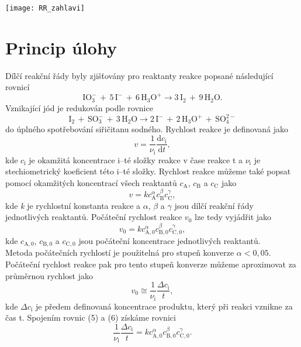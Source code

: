 \documentclass[12pt,a4paper]{article}
\def\ri#1{\mathrm{#1}}
\begin{document}
\begin{center}
\texttt{[image: RR\_zahlavi]}
\end{center}
\section*{Princip úlohy}
\noindent Dílčí reakční řády byly zjišťovány pro reaktanty reakce popsané následující rovnicí
\begin{equation}
	\ri{IO_3^-\,+\,5\,I^-\,+\,6\,H_3O^+} \rightarrow \ri{3\,I_2\,+\,9\,H_2O}.
\end{equation}
Vznikající jód je redukován podle rovnice
\begin{equation}
	\ri{I_2\,+\,SO_3^-\,+\,3\,H_2O} \rightarrow \ri{2\,I^-\,+\,2\,H_3O^+\,+\,SO_4^\ri{2-}}
\end{equation}
do úplného spotřebování siřičitanu sodného.
Rychlost reakce je definovaná jako 
\begin{equation}
	v = \dfrac{1}{\nu_\ri{i}}\dfrac{\ri{d}c_\ri{i}}{\ri{d}t},
\end{equation}
kde $c_\ri{i}$ je okamžitá koncentrace i--té složky reakce v čase reakce t a $\nu_\ri{i}$ je stechiometrický koeficient této i--té složky. Rychlost reakce můžeme také popsat pomocí okamžitých koncentrací všech reaktantů $c_\ri{A}$, $c_\ri{B}$ a $c_\ri{C}$ jako 
\begin{equation}
	v = kc_\ri{A}^\alpha c_\ri{B}^\beta c_\ri{C}^\gamma,
\end{equation}
kde \textit{k} je rychlostní konstanta reakce a $\alpha$, $\beta$ a $\gamma$ jsou dílčí reakční řády jednotlivých reaktantů. Počáteční rychlost reakce $v_0$ lze tedy vyjádřit jako  
\begin{equation}
v_0 = kc_\ri{A, 0}^\alpha c_\ri{B, 0}^\beta c_\ri{C, 0}^\gamma, 
\end{equation}
kde $c_\ri{A, 0}$, $c_\ri{B, 0}$ a $c_\ri{C, 0}$ jsou počáteční koncentrace jednotlivých reaktantů.\\
Metoda počátečních rychlostí je použitelná pro stupeň konverze $\alpha<0,05$. Počáteční rychlost reakce pak pro tento stupeň konverze můžeme aproximovat za průměrnou rychlost jako
\begin{equation}
	v_0 \cong \dfrac{1}{\nu_\ri{i}}\dfrac{\Delta c_\ri{i}}{t},
\end{equation}
kde $\Delta c_\ri{i}$ je předem definovaná koncentrace produktu, který při reakci vznikne za čas t. Spojením rovnic (5) a (6) získáme rovnici
\begin{equation}
	\dfrac{1}{\nu_\ri{i}}\dfrac{\Delta c_\ri{i}}{t} = kc_\ri{A, 0}^\alpha c_\ri{B, 0}^\beta c_\ri{C, 0}^\gamma.
\end{equation}
\end{document}
